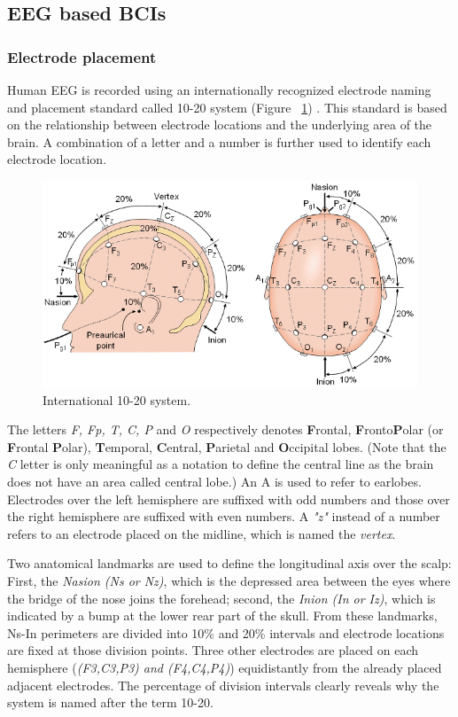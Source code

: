 \documentclass[12pt]{article}
\newcommand\mysubsection[1]{\subsection{#1}}
\newcommand\mysubsubsection[1]{\subsubsection{#1}}
\numberwithin{equation}{section}
\numberwithin{figure}{section}
\numberwithin{table}{section}
\begin{document}
\mysubsection{EEG based BCIs}\label{seq:eeg_bci}

\mysubsubsection{Electrode placement}\label{seq:eeg_placement}
\par{
Human EEG is recorded using an internationally recognized electrode naming and placement 
standard called 10-20 system (Figure ~\ref{fig:eeg_1020}) \citep{jasper_ten_1958}. 
This standard is based on the relationship between electrode locations and the underlying 
area of the brain. A combination of a letter and a number is further used to identify each electrode location.
}
\begin{figure}[ht]
    \centering
    \includegraphics[scale=0.7]{images/10_20_bembook1}
    \caption[International 10-20 system.]{International 10-20 system. \citep{malmivuo_bioelectromagnetism:_1995}}
    \label{fig:eeg_1020}
\end{figure}

\par{
    The letters \emph{F, Fp, T, C, P} and \emph{O} respectively denotes \textbf{F}rontal, \textbf{F}ronto\textbf{P}olar
    (or \textbf{F}rontal \textbf{P}olar), \textbf{T}emporal, \textbf{C}entral, \textbf{P}arietal and
    \textbf{O}ccipital lobes. (Note that the \emph{C} letter is only meaningful as a notation to define the central line
    as the brain does not have an area called central lobe.) An A is used to refer to earlobes.
    Electrodes over the left hemisphere are suffixed with odd numbers and those over the right hemisphere
    are suffixed with even numbers. A \emph{"z"} instead of a number refers to an electrode placed on the midline, which
    is named the \emph{vertex}.
}

\par{
    Two anatomical landmarks are used to define the longitudinal axis over the scalp: First, the \emph{Nasion (Ns or Nz)}, which is the
    depressed area between the eyes where the bridge of the nose joins the forehead; second, the \emph{Inion (In or Iz)}, which is
    indicated by a bump at the lower rear part of the skull. From these landmarks, Ns-In perimeters are divided into 10\% and 20\% intervals
    and electrode locations are fixed at those division points. Three other electrodes are placed on each hemisphere
    (\emph{(F3,C3,P3) and (F4,C4,P4)}) equidistantly from the already placed adjacent electrodes. The percentage of division intervals
    clearly reveals why the system is named after the term 10-20.
}
\end{document}
